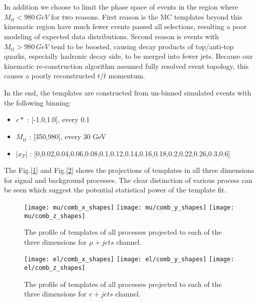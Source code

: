 \documentclass{cmspaperpdf}
\begin{document}
In addition we choose to limit the phase space of events in the region where $M_{t\bar{t}} < 980 \, GeV$ for two reasons. First reason is the MC templates beyond this kinematic region have much fewer events passed all selections, resulting a poor modeling of expected data distributions. Second reason is events with $M_{t\bar{t}} > 980 \, GeV$ tend to be boosted, causing decay products of top/anti-top quarks, especially hadronic decay side, to be  merged into fewer jets. Because our kinematic re-construction algorithm assumed fully resolved event topology, this causes a poorly reconstructed $t/\bar{t}$ momentum. 

In the end, the templates are constructed from un-binned simulated events with the following binning:
\begin{itemize}
\item $c*$ : [-1.0,1.0], every 0.1
\item $M_{t\bar{t}}$ : [350,980], every 30 GeV
\item $|x_F|$ : [0,0.02,0.04,0.06,0.08,0.1,0.12,0.14,0.16,0.18,0.2,0.22,0.26,0.3,0.6]
\end{itemize}

The Fig.[\ref{fig:template_shapes_mu}] and Fig.[\ref{fig:template_shapes_el}] shows the projections of templates in all three dimensions for signal and background processes. The clear distinction of various process can be seen which suggest the potential statistical power of the template fit. 

\begin{figure}[hbt]
  \begin{center}
    \texttt{[image: mu/comb\_x\_shapes]}
    \texttt{[image: mu/comb\_y\_shapes]}
    \texttt{[image: mu/comb\_z\_shapes]}
    
  \caption{\small The profile of templates of all processes projected to each of the three dimensions for $\mu+jets$ channel.}
    \label{fig:template_shapes_mu}
  \end{center}
\end{figure}

\begin{figure}[hbt]
  \begin{center}
    \texttt{[image: el/comb\_x\_shapes]}
    \texttt{[image: el/comb\_y\_shapes]}
    \texttt{[image: el/comb\_z\_shapes]}
    
  \caption{\small The profile of templates of all processes projected to each of the three dimensions for $e+jets$ channel.}
    \label{fig:template_shapes_el}
  \end{center}
\end{figure}
\end{document}

